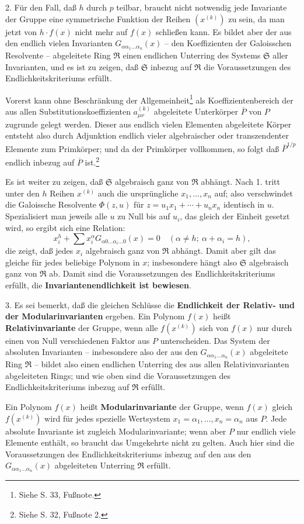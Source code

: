 2. Für den Fall, daß $h$ durch $p$ teilbar, braucht nicht notwendig jede Invariante der Gruppe eine symmetrische Funktion der Reihen $(x^{(k)})$ zu sein, da man jetzt von $h\cdot f(x)$ nicht mehr auf $f(x)$ schließen kann. Es bildet aber der aus den endlich vielen Invarianten $G_{\alpha\alpha_1\ldots\alpha_n}(x)$ -- den Koeffizienten der Galoisschen Resolvente -- abgeleitete Ring $\mathfrak R$ einen endlichen Unterring des Systems $\mathfrak S$ aller Invarianten, und es ist zu zeigen, daß $\mathfrak S$ inbezug auf $\mathfrak R$ die Voraussetzungen des Endlichkeitskriteriums erfüllt.

Vorerst kann ohne Beschränkung der Allgemeinheit\footnote{Siehe S. 33, Fußnote.} als Koeffizientenbereich der aus allen Substitutionskoeffizienten $a_{\mu\nu}^{(k)}$ abgeleitete Unterkörper $\overline P$ von $P$ zugrunde gelegt werden. Dieser aus endlich vielen Elementen abgeleitete Körper entsteht also durch Adjunktion endlich vieler algebraischer oder transzendenter Elemente zum Primkörper; und da der Primkörper vollkommen, so folgt daß $\overline P^{1/p}$ endlich inbezug auf $\overline P$ ist.\footnote{Siehe S. 32, Fußnote 2.}

Es ist weiter zu zeigen, daß $\mathfrak S$ algebraisch ganz von $\mathfrak R$ abhängt. Nach 1. tritt unter den $h$ Reihen $x^{(k)}$ auch die ursprüngliche $x_1,\ldots,x_n$ auf; also verschwindet die Galoissche Resolvente $\Phi(z,u)$ für $z=u_1x_1+\cdots+u_nx_n$ identisch in $u$. Spezialisiert man jeweils alle $u$ zu Null bis auf $u_i$, das gleich der Einheit gesetzt wird, so ergibt sich eine Relation:
\[
 x_i^h+\sum x_i^\alpha G_{\alpha0\ldots\alpha_i\ldots0}(x)=0
 \quad (\alpha\ne h;\ \alpha+\alpha_i=h),
\]
die zeigt, daß jedes $x_i$ algebraisch ganz von $\mathfrak R$ abhängt. Damit aber gilt das gleiche für jedes beliebige Polynom in $x$; insbesondere hängt also $\mathfrak S$ algebraisch ganz von $\mathfrak R$ ab. Damit sind die Voraussetzungen des Endlichkeitskriteriums erfüllt, die \textbf{Invariantenendlichkeit ist bewiesen}.

3. Es sei bemerkt, daß die gleichen Schlüsse die \textbf{Endlichkeit der Relativ- und der Modularinvarianten} ergeben. Ein Polynom $f(x)$ heißt \textbf{Relativinvariante} der Gruppe, wenn alle $f(x^{(k)})$ sich von $f(x)$ nur durch einen von Null verschiedenen Faktor aus $P$ unterscheiden. Das System der absoluten Invarianten -- insbesondere also der aus den $G_{\alpha\alpha_1\ldots\alpha_n}(x)$ abgeleitete Ring $\mathfrak R$ -- bildet also einen endlichen Unterring des aus allen Relativinvarianten abgeleiteten Rings; und wie oben sind die Voraussetzungen des Endlichkeitskriteriums inbezug auf $\mathfrak R$ erfüllt.

Ein Polynom $f(x)$ heißt \textbf{Modularinvariante} der Gruppe, wenn $f(x)$ gleich $f(x^{(k)})$ wird für jedes spezielle Wertsystem $x_1=\alpha_1,\ldots,x_n=\alpha_n$ aus $P$. Jede absolute Invariante ist zugleich Modularinvariante; wenn aber $P$ nur endlich viele Elemente enthält, so braucht das Umgekehrte nicht zu gelten. Auch hier sind die Voraussetzungen des Endlichkeitskriteriums inbezug auf den aus den $G_{\alpha\alpha_1\ldots\alpha_n}(x)$ abgeleiteten Unterring $\mathfrak R$ erfüllt.


\clearpage

